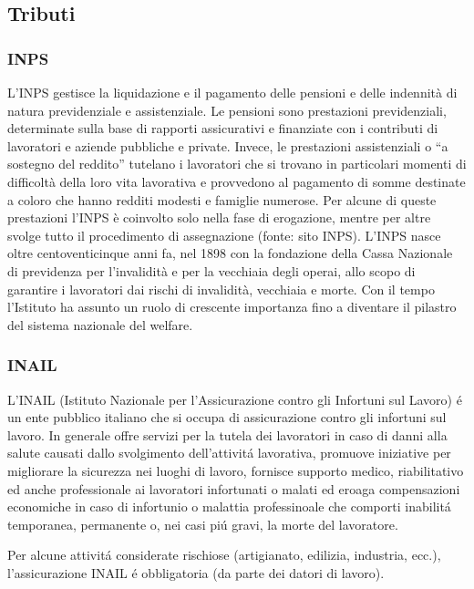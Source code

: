 \documentclass{article}
\begin{document}
\subsection{Tributi}

\subsubsection{INPS}
L’INPS gestisce la liquidazione e il pagamento delle pensioni e delle indennità di natura previdenziale e assistenziale. Le pensioni sono prestazioni previdenziali, determinate sulla base di rapporti assicurativi e finanziate con i contributi di lavoratori e aziende pubbliche e private. Invece, le prestazioni assistenziali o “a sostegno del reddito” tutelano i lavoratori che si trovano in particolari momenti di difficoltà della loro vita lavorativa e provvedono al pagamento di somme destinate a coloro che hanno redditi modesti e famiglie numerose. Per alcune di queste prestazioni l’INPS è coinvolto solo nella fase di erogazione, mentre per altre svolge tutto il procedimento di assegnazione (fonte: sito INPS). L’INPS nasce oltre centoventicinque anni fa, nel 1898 con la fondazione della Cassa Nazionale di previdenza per l'invalidità e per la vecchiaia degli operai, allo scopo di garantire i lavoratori dai rischi di invalidità, vecchiaia e morte. Con il tempo l’Istituto ha assunto un ruolo di crescente importanza fino a diventare il pilastro del sistema nazionale del welfare.

\subsubsection{INAIL}
L'INAIL (Istituto Nazionale per l'Assicurazione contro gli Infortuni sul Lavoro) \'e un ente pubblico italiano che si occupa di assicurazione contro gli infortuni sul lavoro.
In generale offre servizi per la tutela dei lavoratori in caso di danni alla salute causati dallo svolgimento dell'attivit\'a lavorativa, promuove iniziative per migliorare la sicurezza nei luoghi di lavoro, 
fornisce supporto medico, riabilitativo ed anche professionale ai lavoratori infortunati o malati ed eroaga compensazioni economiche in caso di infortunio o malattia professinoale che comporti inabilit\'a temporanea, permanente o, nei casi pi\'u gravi, la morte del lavoratore.

Per alcune attivit\'a considerate rischiose (artigianato, edilizia, industria, ecc.), l'assicurazione INAIL \'e obbligatoria (da parte dei datori di lavoro).
\end{document}
